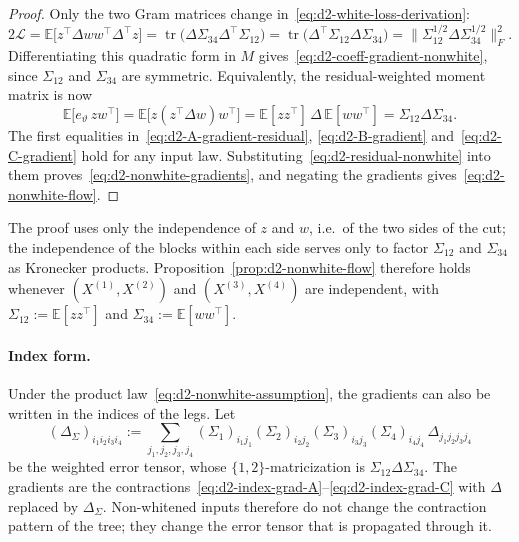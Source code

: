 \documentclass[11pt]{article}
\newcommand{\E}{\mathbb{E}}
\newcommand{\norm}[1]{\lVert #1\rVert}
\theoremstyle{definition}
\numberwithin{equation}{section}
\begin{document}
\begin{proof}
Only the two Gram matrices change in~\eqref{eq:d2-white-loss-derivation}:
\begin{equation}\label{eq:d2-nonwhite-loss-derivation}
2\mathcal L=\E\big[z^\top\Delta ww^\top\Delta^\top z\big]=\operatorname{tr}\big(\Delta\Sigma_{34}\Delta^\top\Sigma_{12}\big)=\operatorname{tr}\big(\Delta^\top\Sigma_{12}\Delta\Sigma_{34}\big)=\norm{\Sigma_{12}^{1/2}\Delta\Sigma_{34}^{1/2}}_F^2.
\end{equation}
Differentiating this quadratic form in $M$ gives~\eqref{eq:d2-coeff-gradient-nonwhite}, since $\Sigma_{12}$ and $\Sigma_{34}$ are symmetric. Equivalently, the residual-weighted moment matrix is now
\begin{equation}\label{eq:d2-residual-nonwhite}
\E\big[e_\vartheta\,zw^\top\big]=\E\big[z(z^\top\Delta w)w^\top\big]=\E[zz^\top]\,\Delta\,\E[ww^\top]=\Sigma_{12}\Delta\Sigma_{34}.
\end{equation}
The first equalities in~\eqref{eq:d2-A-gradient-residual}, \eqref{eq:d2-B-gradient} and~\eqref{eq:d2-C-gradient} hold for any input law. Substituting~\eqref{eq:d2-residual-nonwhite} into them proves~\eqref{eq:d2-nonwhite-gradients}, and negating the gradients gives~\eqref{eq:d2-nonwhite-flow}.
\end{proof}

The proof uses only the independence of $z$ and $w$, i.e.\ of the two sides of the cut; the independence of the blocks within each side serves only to factor $\Sigma_{12}$ and $\Sigma_{34}$ as Kronecker products. Proposition~\ref{prop:d2-nonwhite-flow} therefore holds whenever $(X^{(1)},X^{(2)})$ and $(X^{(3)},X^{(4)})$ are independent, with $\Sigma_{12}:=\E[zz^\top]$ and $\Sigma_{34}:=\E[ww^\top]$.

\paragraph{Index form.}
Under the product law~\eqref{eq:d2-nonwhite-assumption}, the gradients can also be written in the indices of the legs. Let
\begin{equation}\label{eq:d2-weighted-index-error}
(\Delta_\Sigma)_{i_1i_2i_3i_4}:=\sum_{j_1,j_2,j_3,j_4}(\Sigma_1)_{i_1j_1}(\Sigma_2)_{i_2j_2}(\Sigma_3)_{i_3j_3}(\Sigma_4)_{i_4j_4}\,\Delta_{j_1j_2j_3j_4}
\end{equation}
be the weighted error tensor, whose $\{1,2\}$-matricization is $\Sigma_{12}\Delta\Sigma_{34}$. The gradients are the contractions~\eqref{eq:d2-index-grad-A}--\eqref{eq:d2-index-grad-C} with $\Delta$ replaced by $\Delta_\Sigma$. Non-whitened inputs therefore do not change the contraction pattern of the tree; they change the error tensor that is propagated through it.
\end{document}
